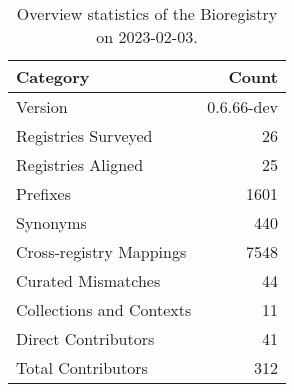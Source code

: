 \begin{table}
\centering
\caption{Overview statistics of the Bioregistry on 2023-02-03.}
\label{tab:bioregistry-summary}
\begin{tabular}{lr}
\toprule
                Category &      Count \\
\midrule
                 Version & 0.6.66-dev \\
     Registries Surveyed &         26 \\
      Registries Aligned &         25 \\
                Prefixes &       1601 \\
                Synonyms &        440 \\
 Cross-registry Mappings &       7548 \\
      Curated Mismatches &         44 \\
Collections and Contexts &         11 \\
     Direct Contributors &         41 \\
      Total Contributors &        312 \\
\bottomrule
\end{tabular}
\end{table}
